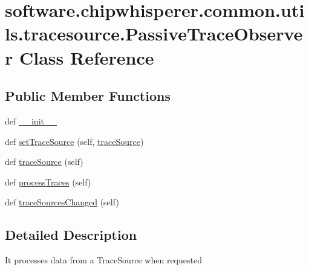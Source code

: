 \hypertarget{classsoftware_1_1chipwhisperer_1_1common_1_1utils_1_1tracesource_1_1PassiveTraceObserver}{}\section{software.\+chipwhisperer.\+common.\+utils.\+tracesource.\+Passive\+Trace\+Observer Class Reference}
\label{classsoftware_1_1chipwhisperer_1_1common_1_1utils_1_1tracesource_1_1PassiveTraceObserver}
\subsection*{Public Member Functions}
\begin{DoxyCompactItemize}
\item 
def \hyperlink{classsoftware_1_1chipwhisperer_1_1common_1_1utils_1_1tracesource_1_1PassiveTraceObserver_a315712dd352572613d539fcbcbfd890b}{\+\_\+\+\_\+init\+\_\+\+\_\+}
\item 
def \hyperlink{classsoftware_1_1chipwhisperer_1_1common_1_1utils_1_1tracesource_1_1PassiveTraceObserver_a86dbfff05e7c94cc850695e7e1cfa19f}{set\+Trace\+Source} (self, \hyperlink{classsoftware_1_1chipwhisperer_1_1common_1_1utils_1_1tracesource_1_1PassiveTraceObserver_a568937b55f6c7678e712b0a8ce114d4b}{trace\+Source})
\item 
def \hyperlink{classsoftware_1_1chipwhisperer_1_1common_1_1utils_1_1tracesource_1_1PassiveTraceObserver_a568937b55f6c7678e712b0a8ce114d4b}{trace\+Source} (self)
\item 
def \hyperlink{classsoftware_1_1chipwhisperer_1_1common_1_1utils_1_1tracesource_1_1PassiveTraceObserver_aa69f8f052016fcce1396b89909790afe}{process\+Traces} (self)
\item 
def \hyperlink{classsoftware_1_1chipwhisperer_1_1common_1_1utils_1_1tracesource_1_1PassiveTraceObserver_ac2f2d80249923116d46080c478962455}{trace\+Sources\+Changed} (self)
\end{DoxyCompactItemize}


\subsection{Detailed Description}
\begin{DoxyVerb}It processes data from a TraceSource when requested \end{DoxyVerb}
 

